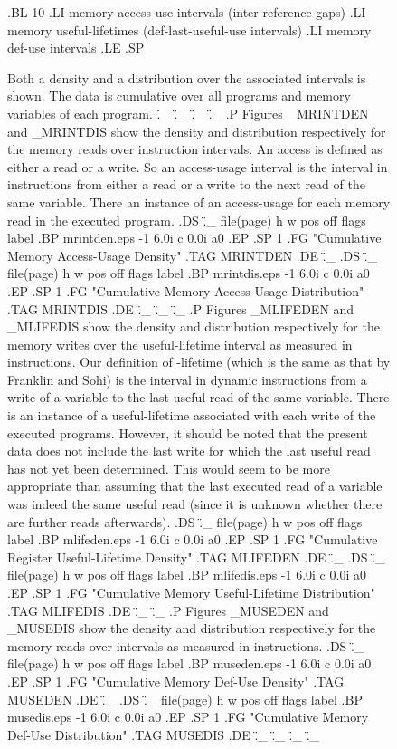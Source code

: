 \begin{figure}
.BL 10
.LI
memory access-use intervals (inter-reference gaps)
.LI
memory useful-lifetimes (def-last-useful-use intervals)
.LI
memory def-use intervals
.LE
.SP


Both a density and a distribution over the
associated intervals is shown.
The data is cumulative over all programs and memory variables
of each program.
.\"_
.\"_
.\"_
.\"_
.P
Figures \_MRINTDEN and \_MRINTDIS show the density and distribution
respectively for the memory reads over instruction intervals.
An access is defined as either a read or a write.
So an access-usage interval is the interval in instructions
from either a read or a write to the next read of the same
variable.  
There an instance of an access-usage for each memory
read in the executed program.
.DS
.\"_ file(page) h w pos off flags label
.BP mrintden.eps -1 6.0i c 0.0i a0
.EP
.SP 1
.FG "Cumulative Memory Access-Usage Density"
.TAG MRINTDEN
.DE
.\"_
.DS
.\"_ file(page) h w pos off flags label
.BP mrintdis.eps -1 6.0i c 0.0i a0
.EP
.SP 1
.FG "Cumulative Memory Access-Usage Distribution"
.TAG MRINTDIS
.DE
.\"_
.\"_
.\"_
.P
Figures \_MLIFEDEN and \_MLIFEDIS show the density and distribution
respectively for the memory writes over the useful-lifetime interval
as measured in instructions.
Our definition of \fIUseful-lifetime\fP 
(which is the same as that by Franklin and Sohi)
is the interval in dynamic instructions from a write of a variable
to the last useful read of the same variable.
There is an instance of a useful-lifetime associated with
each write of the executed programs.  However, it should be noted
that the present data does not include the last write for which
the last useful read has not yet been determined. 
This would seem to be more appropriate than assuming that the
last executed read of a variable was indeed the same useful read (since
it is unknown whether there are further reads afterwards).
.DS
.\"_ file(page) h w pos off flags label
.BP mlifeden.eps -1 6.0i c 0.0i a0
.EP
.SP 1
.FG "Cumulative Register Useful-Lifetime Density"
.TAG MLIFEDEN
.DE
.\"_
.DS
.\"_ file(page) h w pos off flags label
.BP mlifedis.eps -1 6.0i c 0.0i a0
.EP
.SP 1
.FG "Cumulative Memory Useful-Lifetime Distribution"
.TAG MLIFEDIS
.DE
.\"_
.\"_
.P
Figures \_MUSEDEN and \_MUSEDIS show the density and distribution
respectively for the memory reads over
intervals
as measured in instructions.
.DS
.\"_ file(page) h w pos off flags label
.BP museden.eps -1 6.0i c 0.0i a0
.EP
.SP 1
.FG "Cumulative Memory Def-Use Density"
.TAG MUSEDEN
.DE
.\"_
.DS
.\"_ file(page) h w pos off flags label
.BP musedis.eps -1 6.0i c 0.0i a0
.EP
.SP 1
.FG "Cumulative Memory Def-Use Distribution"
.TAG MUSEDIS
.DE
.\"_
.\"_
.\"_
.\"_






\end{figure}
